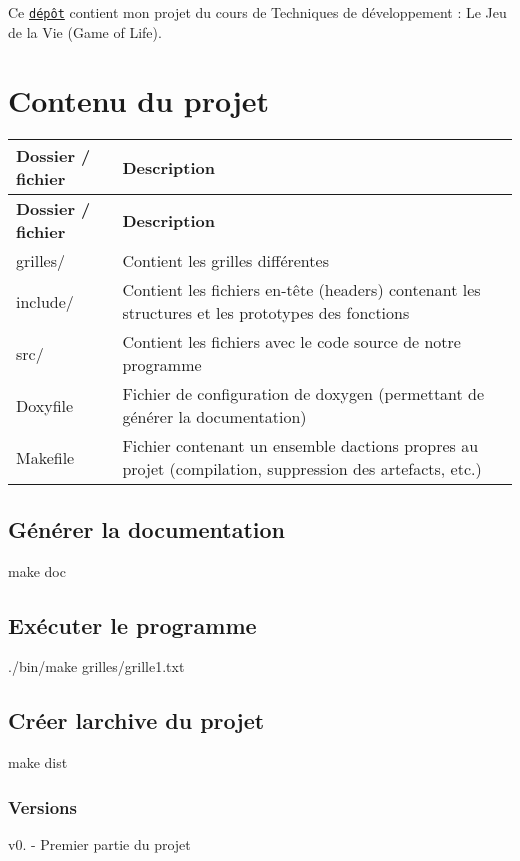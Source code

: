 Ce \href{https://git.unistra.fr/sushko/Jeu_de_la_vie}{\tt dépôt} contient mon projet du cours de Techniques de développement \+: Le Jeu de la Vie (Game of Life).

\section*{Contenu du projet}

\tabulinesep=1mm
\begin{longtabu} spread 0pt [c]{*{2}{|X[-1]}|}
\hline
\rowcolor{\tableheadbgcolor}\textbf{ Dossier / fichier }&\textbf{ Description  }\\
\endfirsthead
\hline
\endfoot
\hline
\rowcolor{\tableheadbgcolor}\textbf{ Dossier / fichier }&\textbf{ Description  }\\
\endhead
grilles/ &Contient les grilles différentes \\
include/ &Contient les fichiers en-\/tête (headers) contenant les structures et les prototypes des fonctions \\
src/ &Contient les fichiers avec le code source de notre programme \\
Doxyfile &Fichier de configuration de doxygen (permettant de générer la documentation) \\
Makefile &Fichier contenant un ensemble d\textquotesingle{}actions propres au projet (compilation, suppression des artefacts, etc.) \\
\end{longtabu}
\subsection*{Générer la documentation }


\begin{DoxyCode}
make doc
\end{DoxyCode}


\subsection*{Exécuter le programme }


\begin{DoxyCode}
./bin/make grilles/grille1.txt
\end{DoxyCode}


\subsection*{Créer l\textquotesingle{}archive du projet }


\begin{DoxyCode}
make dist
\end{DoxyCode}


\subsubsection*{Versions}


\begin{DoxyItemize}
\item v0. -\/ Premier partie du projet 
\end{DoxyItemize}
